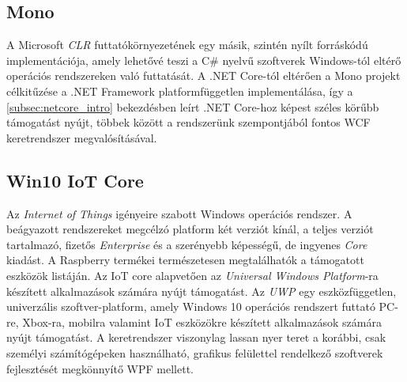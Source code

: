 \subsection{Mono}

A Microsoft \emph{CLR} futtatókörnyezetének egy másik, szintén nyílt forráskódú implementációja, amely lehetővé teszi a C\# nyelvű szoftverek Windows-tól eltérő operációs rendszereken való futtatását. A .NET Core-tól eltérően a Mono projekt célkitűzése a .NET Framework platformfüggetlen implementálása, így a \ref{subsec:netcore_intro} bekezdésben leírt .NET Core-hoz képest széles körűbb támogatást nyújt, többek között a rendszerünk szempontjából fontos WCF keretrendszer megvalósításával.

\subsection{Win10 IoT Core}

Az \emph{Internet of Things} igényeire szabott Windows operációs rendszer. A beágyazott rendszereket megcélzó platform két verziót kínál, a teljes verziót tartalmazó, fizetős \emph{Enterprise} és a szerényebb képességű, de ingyenes \emph{Core} kiadást. A Raspberry termékei természetesen megtalálhatók a támogatott eszközök listáján. Az IoT core alapvetően az \emph{Universal Windows Platform}-ra készített alkalmazások számára nyújt támogatást. Az \emph{UWP} egy eszközfüggetlen, univerzális szoftver-platform, amely Windows 10 operációs rendszert futtató PC-re, Xbox-ra, mobilra valamint IoT eszközökre készített alkalmazások számára nyújt támogatást. A keretrendszer viszonylag lassan nyer teret a korábbi, csak személyi számítógépeken használható, grafikus felülettel rendelkező szoftverek fejlesztését megkönnyítő WPF mellett.

